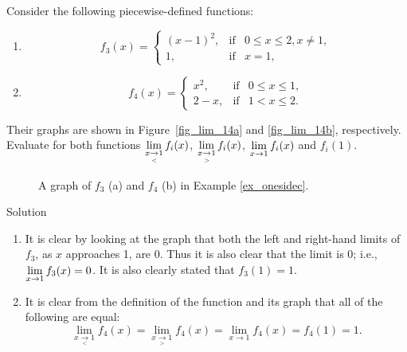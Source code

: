 \begin{example}
\label{ex_onesidec}
Consider the following piecewise-defined functions:
\begin{multicols}{2}
\begin{enumerate}
\item
$$
f_3(x) = \left\{\begin{array}{lcl} (x-1)^2, & \mbox{if} &  0\leq x\leq 2, x\neq 1, \\ 1, & \mbox{if} &  x=1,\end{array}\right.
$$
\item
$$
f_4(x) = \left\{\begin{array}{lcl} x^2, & \mbox{if} &  0\leq x\leq 1, \\ 2-x, & \mbox{if} &  1<x\leq 2. \end{array}\right.
$$
\end{enumerate}
\end{multicols}
Their graphs are shown  in Figure~\ref{fig_lim_14a} and \ref{fig_lim_14b}, respectively. Evaluate for both functions $\displaystyle \lim_{x\underset{<}{\rightarrow}1} f_i(x)$, $\displaystyle \lim_{x\underset{>}{\rightarrow}1} f_i(x)$, $\displaystyle \lim_{x\to 1} f_i(x)$ and $f_i(1)$.


\begin{figure}[H]
\centerline{
\qquad
{}
}
\caption{A graph of $f_3$ (a) and $f_4$ (b) in Example \ref{ex_onesidec}. }
\end{figure}



Solution 

\begin{enumerate}
\item It is clear by looking at the graph that both the left and right-hand limits of $f_3$, as $x$ approaches 1, are 0. Thus it is also clear that the limit is 0; i.e., $\displaystyle \lim_{x\to 1} f_3(x) = 0$. It is also clearly stated that $f_3(1) = 1$. 
\item It is clear from the definition of the function and its graph that all of the following are equal:
$$ \lim_{x\underset{<}{\rightarrow}1} f_4(x) = \lim_{x\underset{>}{\rightarrow}1} f_4(x) =\lim_{x\to 1} f_4(x) =f_4(1) = 1.$$
\end{enumerate}
\end{example}


